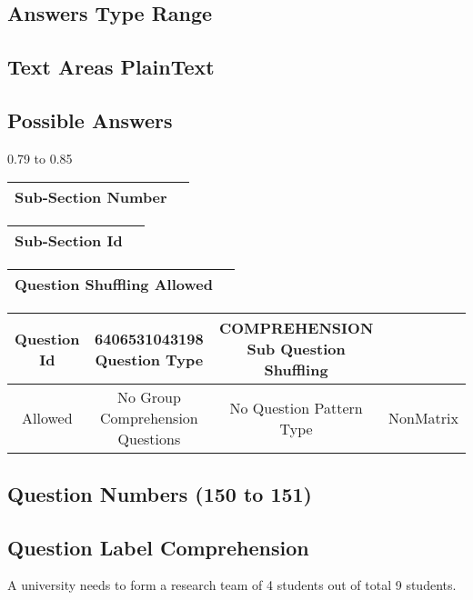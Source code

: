\documentclass{article}
\begin{document}
\subsection{Answers Type  Range}

\subsection{Text Areas  PlainText}

\subsection{Possible Answers }

0.79 to 0.85\\

\begin{longtable}{|c|c|}
\hline
\textbf{Sub-Section Number} & \textbf{} \\ \hline
\end{longtable}

\begin{longtable}{|c|c|}
\hline
\textbf{Sub-Section Id} & \textbf{} \\ \hline
\end{longtable}

\begin{longtable}{|c|c|}
\hline
\textbf{Question Shuffling Allowed} & \textbf{} \\ \hline
\end{longtable}

\begin{longtable}{|c|c|c|c|}
\hline
\textbf{Question Id} & \textbf{6406531043198 Question Type} & \textbf{COMPREHENSION Sub Question Shuffling} & \textbf{} \\ \hline
Allowed & No Group Comprehension Questions & No Question Pattern Type & NonMatrix \\ \hline
\end{longtable}

\subsection{Question Numbers  (150 to 151)}

\subsection{Question Label  Comprehension}

A university needs to form a research team of 4 students out of total 9 students. 
 
\end{document}
